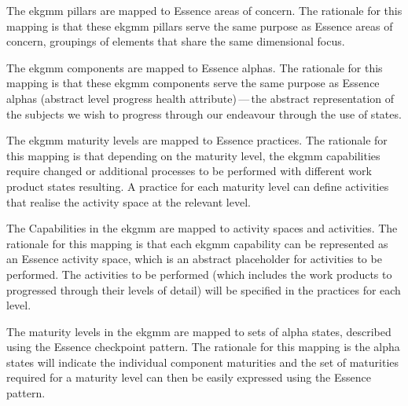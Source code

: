 \begin{description}[nosep,font=\bfseries]

  \item [areas of concern]
  The \gls{ekgmm} pillars are mapped to Essence areas of concern.
  The rationale for this mapping is that these \gls{ekgmm} pillars serve the same purpose as
  Essence areas of concern, groupings of elements that share the same dimensional focus.

  \item [alphas]
  The \gls{ekgmm} components are mapped to Essence alphas.
  The rationale for this mapping is that these \gls{ekgmm} components serve the same purpose as
  Essence alphas (abstract level progress health attribute)\,---\,the abstract representation of the subjects
  we wish to progress through our endeavour through the use of states.

  \item [practices]
  The \gls{ekgmm} maturity levels are mapped to Essence practices.
  The rationale for this mapping is that depending on the maturity level, the \gls{ekgmm} capabilities
  require changed or additional processes to be performed with different work product states resulting.
  A practice for each maturity level can define activities that realise the activity space at the relevant level.

  \item [activity spaces, activities and work products]
  The Capabilities in the \gls{ekgmm} are mapped to activity spaces and activities.
  The rationale for this mapping is that each \gls{ekgmm} capability can be represented as an Essence activity space,
  which is an abstract placeholder for activities to be performed.
  The activities to be performed (which includes the work products to progressed through their levels of detail)
  will be specified in the practices for each level.

  \item [checkpoint pattern]
  The maturity levels in the \gls{ekgmm} are mapped to sets of alpha states, described using the
  Essence checkpoint pattern.
  The rationale for this mapping is the alpha states will indicate the individual component maturities and
  the set of maturities required for a maturity level can then be easily expressed using the Essence pattern.

\end{description}
